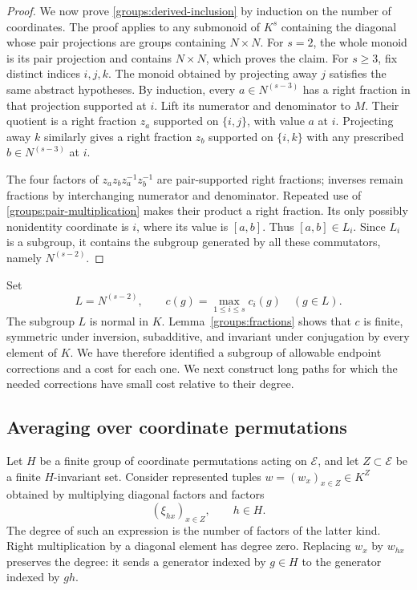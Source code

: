 \begin{proof}
We now prove \eqref{groups:derived-inclusion} by induction on the number
of coordinates.  The proof applies to any submonoid of $K^s$ containing
the diagonal whose pair projections are groups containing $N\times N$.
For $s=2$, the whole monoid is its pair projection and contains
$N\times N$, which proves the claim.
For $s\ge3$, fix distinct indices $i,j,k$.
The monoid obtained by projecting away $j$ satisfies the same abstract
hypotheses.  By induction, every $a\in N^{(s-3)}$ has a right fraction
in that projection supported at $i$.  Lift its numerator and denominator
to $M$.  Their quotient is a right fraction $z_a$ supported on $\{i,j\}$,
with value $a$ at $i$.  Projecting away $k$ similarly gives a right
fraction $z_b$ supported on $\{i,k\}$ with any prescribed
$b\in N^{(s-3)}$ at $i$.

The four factors of $z_a z_b z_a^{-1}z_b^{-1}$ are pair-supported
right fractions; inverses remain fractions by interchanging numerator
and denominator.  Repeated use of \eqref{groups:pair-multiplication}
makes their product a right fraction.  Its only possibly nonidentity
coordinate is $i$, where its value is $[a,b]$.
Thus $[a,b]\in L_i$.  Since $L_i$ is a subgroup, it contains the subgroup
generated by all these commutators, namely $N^{(s-2)}$.
\end{proof}

Set
\begin{equation}\label{groups:cost}
 L=N^{(s-2)},\qquad c(g)=\max_{1\le i\le s}c_i(g)\quad(g\in L).
\end{equation}
The subgroup $L$ is normal in $K$.  Lemma~\ref{groups:fractions} shows
that $c$ is finite, symmetric under inversion, subadditive, and invariant
under conjugation by every element of $K$.  We have therefore identified
a subgroup of allowable endpoint corrections and a cost for each one.
We next construct long paths for which the needed corrections have
small cost relative to their degree.

\subsection{Averaging over coordinate permutations}

Let $H$ be a finite group of coordinate permutations acting on
$\mathcal E$, and let $Z\subset\mathcal E$ be a finite $H$-invariant set.
Consider represented tuples $w=(w_x)_{x\in Z}\in K^Z$ obtained by
multiplying diagonal factors and factors
\[
 (\xi_{h x})_{x\in Z},\qquad h\in H.
\]
The degree of such an expression is the number of factors of the latter
kind.  Right multiplication by a diagonal element has degree zero.
Replacing $w_x$ by $w_{h x}$ preserves the degree: it sends a generator
indexed by $g\in H$ to the generator indexed by $gh$.

